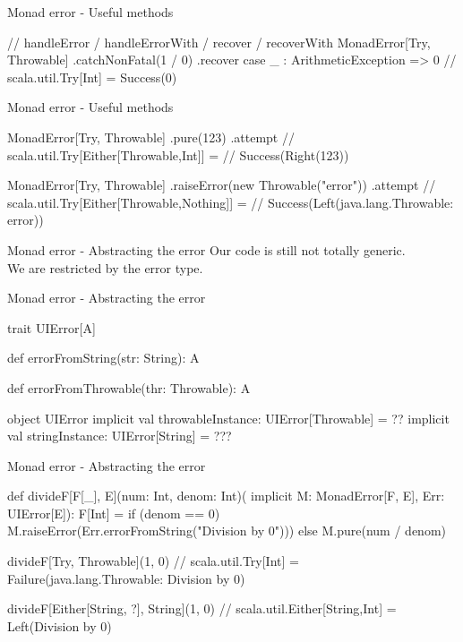 \documentclass[13pt]{beamer}
\begin{document}
\begin{frame}[fragile]{Monad error - Useful methods}
  \begin{scalaCode}

  // handleError / handleErrorWith / recover / recoverWith
  MonadError[Try, Throwable]
    .catchNonFatal(1 / 0)
    .recover {
      case _ : ArithmeticException => 0
    }
  // scala.util.Try[Int] = Success(0)

  \end{scalaCode}

\end{frame}


\begin{frame}[fragile]{Monad error - Useful methods}
  \begin{scalaCode}

  MonadError[Try, Throwable]
    .pure(123)
    .attempt
  // scala.util.Try[Either[Throwable,Int]] =
  //    Success(Right(123))

  MonadError[Try, Throwable]
    .raiseError(new Throwable("error"))
    .attempt 
  // scala.util.Try[Either[Throwable,Nothing]] =
  //    Success(Left(java.lang.Throwable: error))

  \end{scalaCode}

\end{frame}

\begin{frame}[fragile]{Monad error - Abstracting the error}
  Our code is still not totally generic. \\
  We are restricted by the error type.

\end{frame}

\begin{frame}[fragile]{Monad error - Abstracting the error}
  \begin{scalaCode}
  trait UIError[A] {
    def errorFromString(str: String): A

    def errorFromThrowable(thr: Throwable): A
  }

  object UIError {
    implicit val throwableInstance: UIError[Throwable] = ??
    implicit val stringInstance: UIError[String] = ???
  }
  \end{scalaCode}


\end{frame}


\begin{frame}[fragile]{Monad error - Abstracting the error}

  \begin{scalaCode}
  def divideF[F[_], E](num: Int, denom: Int)(
    implicit M: MonadError[F, E], Err: UIError[E]): F[Int] = {
    if (denom == 0) M.raiseError(Err.errorFromString("Division by 0")))
    else M.pure(num / denom)
  }

  divideF[Try, Throwable](1, 0)
  // scala.util.Try[Int] = Failure(java.lang.Throwable: Division by 0)
  
  divideF[Either[String, ?], String](1, 0) 
  // scala.util.Either[String,Int] = Left(Division by 0)

  \end{scalaCode}
\end{frame}
\end{document}
